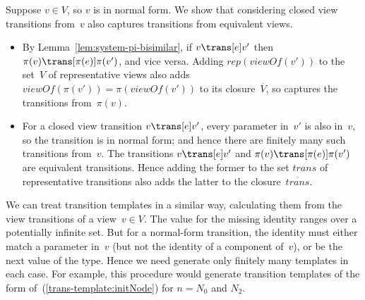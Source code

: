 Suppose $v \in V$, so $v$ is in normal form.  We show that considering closed
view transitions from~$v$ also captures transitions from equivalent views.
%
\begin{itemize}
\item By Lemma~\ref{lem:system-pi-bisimilar}, if $v \trans[e] v'$ then $\pi(v)
  \trans[\pi(e)] \pi(v')$, and vice versa.  Adding $rep(viewOf(v'))$ to the
  set~$V$ of representative views also adds $viewOf(\pi(v')) =
  \pi(viewOf(v'))$ to its closure~$\overline{V}$, so captures the transitions
  from~$\pi(v)$.

\item For a closed view transition $v \trans[e] v'$, every parameter in~$v'$
  is also in~$v$, so the transition is in normal form; and hence there are
  finitely many such transitions from~$v$.  The transitions $v \trans[e] v'$
  and $\pi(v) \trans[\pi(e)] \pi(v')$ are equivalent transitions.  Hence
  adding the former to the set $trans$ of representative transitions also adds
  the latter to the closure~$\overline{trans}$.
\end{itemize}



We can treat transition templates in a similar way, calculating them from the
view transitions of a view~$v \in V$.  The value for the missing identity
ranges over a potentially infinite set.  But for a normal-form transition, the
identity must either match a parameter in~$v$ (but not the identity of a
component of~$v$), or be the next value of the type.  Hence we need generate
only finitely many templates in each case.  
For example, this procedure would generate transition templates of the form
of~(\ref{trans-template:initNode}) for $n = N_0$ and $N_2$.


